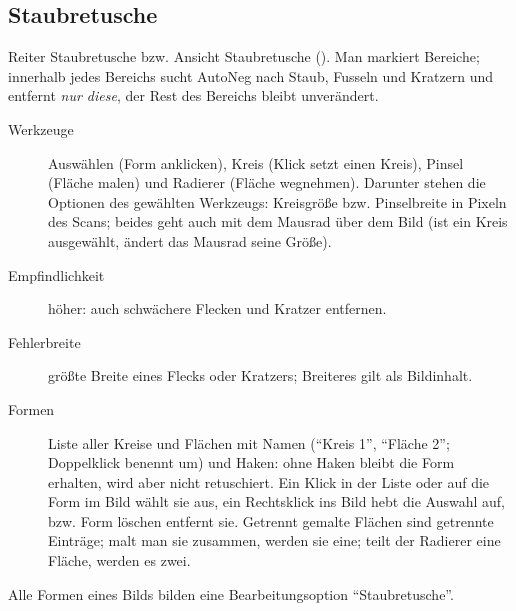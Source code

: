 \documentclass[a4paper,11pt,parskip=half,DIV=12]{scrartcl}
\newcommand{\menu}[1]{\textsf{#1}}                    %
\newcommand{\taste}[1]{\fbox{\footnotesize\textsf{#1}}} %
\begin{document}
\subsection{Staubretusche}
Reiter \menu{Staubretusche} bzw. \menu{Ansicht \textrightarrow{} Staubretusche} (\taste{R}).
Man markiert Bereiche; innerhalb jedes Bereichs sucht AutoNeg nach Staub, Fusseln und Kratzern
und entfernt \emph{nur diese}, der Rest des Bereichs bleibt unverändert.
\begin{description}
  \item[Werkzeuge] \menu{Auswählen} (Form anklicken), \menu{Kreis} (Klick setzt einen Kreis),
        \menu{Pinsel} (Fläche malen) und \menu{Radierer} (Fläche wegnehmen). Darunter stehen die
        Optionen des gewählten Werkzeugs: \menu{Kreisgröße} bzw. \menu{Pinselbreite} in Pixeln
        des Scans; beides geht auch mit dem Mausrad über dem Bild (ist ein Kreis ausgewählt,
        ändert das Mausrad seine Größe).
  \item[Empfindlichkeit] höher: auch schwächere Flecken und Kratzer entfernen.
  \item[Fehlerbreite] größte Breite eines Flecks oder Kratzers; Breiteres gilt als Bildinhalt.
  \item[Formen] Liste aller Kreise und Flächen mit Namen (\enquote{Kreis 1}, \enquote{Fläche 2};
        Doppelklick benennt um) und Haken: ohne Haken bleibt die Form erhalten, wird aber
        nicht retuschiert. Ein Klick in der Liste oder auf die Form im Bild wählt sie aus,
        ein Rechtsklick ins Bild hebt die Auswahl auf, \taste{Entf} bzw. \menu{Form löschen}
        entfernt sie. Getrennt gemalte Flächen sind getrennte Einträge; malt man sie
        zusammen, werden sie eine; teilt der Radierer eine Fläche, werden es zwei.
\end{description}
Alle Formen eines Bilds bilden eine Bearbeitungsoption \enquote{Staubretusche}.
\end{document}
